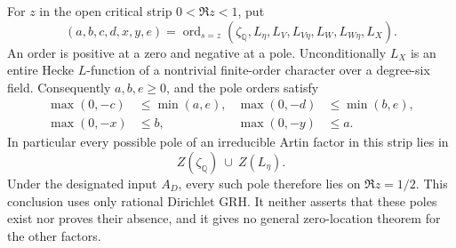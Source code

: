 For $z$ in the open critical strip $0<\Re z<1$, put
\[
 (a,b,c,d,x,y,e)=\operatorname{ord}_{s=z}
 (\zeta_{\mathbb Q},L_\eta,L_V,L_{V\eta},L_W,L_{W\eta},L_X).
 \tag{S506.2}
\]
An order is positive at a zero and negative at a pole.
Unconditionally $L_X$ is an entire Hecke $L$-function of a
nontrivial finite-order character over a degree-six field.
Consequently $a,b,e\ge0$, and the pole orders satisfy
\[
 \begin{aligned}
 \max(0,-c)&\le\min(a,e),&
 \max(0,-d)&\le\min(b,e),\\
 \max(0,-x)&\le b,&
 \max(0,-y)&\le a.
 \end{aligned}
 \tag{S506.3}
\]
In particular every possible pole of an irreducible Artin factor
in this strip lies in
\[
          Z(\zeta_{\mathbb Q})\ \cup\ Z(L_\eta).
 \tag{S506.4}
\]
Under the designated input $A_D$, every such pole therefore lies
on $\Re z=1/2$.  This conclusion uses only rational Dirichlet GRH.
It neither asserts that these poles exist nor proves their absence,
and it gives no general zero-location theorem for the other factors.

